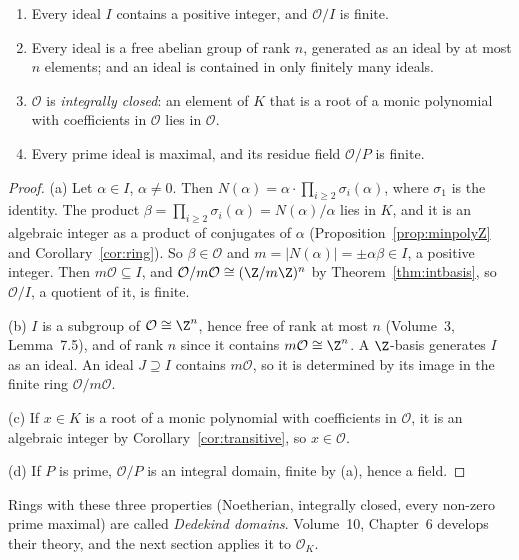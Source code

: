 \begin{proposition}\label{prop:noeth}
\begin{enumerate}[label=(\alph*)]
\item Every ideal $I$ contains a positive integer, and $\mathcal O/I$ is finite.
\item Every ideal is a free abelian group of rank $n$, generated as an ideal by at most $n$ elements; and an ideal is
contained in only finitely many ideals.
\item $\mathcal O$ is \emph{integrally closed}: an element of $K$ that is a root of a monic polynomial with coefficients in
$\mathcal O$ lies in $\mathcal O$.
\item Every prime ideal is maximal, and its residue field $\mathcal O/P$ is finite.
\end{enumerate}
\end{proposition}
\begin{proof}
(a) Let $\alpha\in I$, $\alpha\ne0$. Then $N(\alpha)=\alpha\cdot\prod_{i\ge2}\sigma_i(\alpha)$, where $\sigma_1$ is the
identity. The product $\beta=\prod_{i\ge2}\sigma_i(\alpha)=N(\alpha)/\alpha$ lies in $K$, and it is an algebraic integer
as a product of conjugates of $\alpha$ (Proposition~\ref{prop:minpolyZ} and Corollary~\ref{cor:ring}). So $\beta\in\mathcal
O$ and $m=|N(\alpha)|=\pm\alpha\beta\in I$, a positive integer. Then $m\mathcal O\subseteq I$, and $\mathcal O/m\mathcal
O\cong(\Z/m\Z)^n$ by Theorem~\ref{thm:intbasis}, so $\mathcal O/I$, a quotient of it, is finite.

(b) $I$ is a subgroup of $\mathcal O\cong\Z^n$, hence free of rank at most $n$ (Volume~3, Lemma~7.5), and of rank $n$
since it contains $m\mathcal O\cong\Z^n$. A $\Z$-basis generates $I$ as an ideal. An ideal $J\supseteq I$ contains
$m\mathcal O$, so it is determined by its image in the finite ring $\mathcal O/m\mathcal O$.

(c) If $x\in K$ is a root of a monic polynomial with coefficients in $\mathcal O$, it is an algebraic integer by
Corollary~\ref{cor:transitive}, so $x\in\mathcal O$.

(d) If $P$ is prime, $\mathcal O/P$ is an integral domain, finite by (a), hence a field.
\end{proof}

Rings with these three properties (Noetherian, integrally closed, every non-zero prime maximal) are called
\emph{Dedekind domains}. Volume~10, Chapter~6 develops their theory, and the next section applies it to $\mathcal O_K$.

